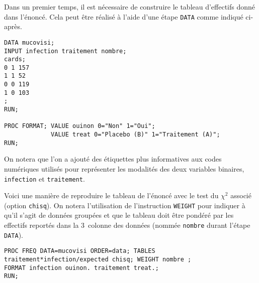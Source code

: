\soln{\ref{exo:10.4}} Dans un premier temps, il est nécessaire de construire
le tableau d'effectifs donné dans l'énoncé. Cela peut être réalisé à l'aide
d'une étape \texttt{DATA} comme indiqué ci-après.
\begin{verbatim}
DATA mucovisi;
INPUT infection traitement nombre;
cards;
0 1 157
1 1 52
0 0 119
1 0 103
;
RUN;

PROC FORMAT; VALUE ouinon 0="Non" 1="Oui";
             VALUE treat 0="Placebo (B)" 1="Traitement (A)";
RUN;
\end{verbatim}
On notera que l'on a ajouté des étiquettes plus informatives aux codes
numériques utilisés pour représenter les modalités des deux variables
binaires, \texttt{infection} et \texttt{traitement}.

Voici une manière de reproduire le tableau de l'énoncé avec le test du
$\chi^2$ associé (option \texttt{chisq}). On notera l'utilisation de
l'instruction \texttt{WEIGHT} pour indiquer à \SAS qu'il s'agit de données
groupées et que le tableau doit être pondéré par les effectifs reportés dans
la 3\ieme\ colonne des données (nommée \texttt{nombre} durant l'étape
\texttt{DATA}).
\begin{verbatim}
PROC FREQ DATA=mucovisi ORDER=data; TABLES traitement*infection/expected chisq; WEIGHT nombre ;
FORMAT infection ouinon. traitement treat.;
RUN;
\end{verbatim}

